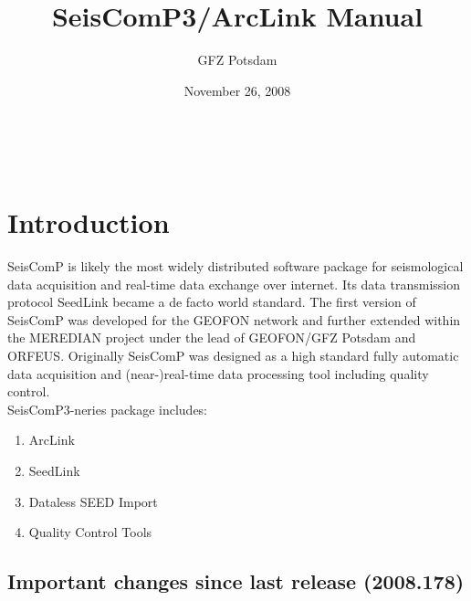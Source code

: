 \documentclass[11pt,a4paper,titlepage]{article}
\title{SeisComP3/ArcLink Manual}
\author{GFZ Potsdam}
\date{November 26, 2008}
\begin{document}
\maketitle

\setcounter{page}{2}


\
\vfill
\tableofcontents
\vfill
\

\clearpage


\section{Introduction}
SeisComP is likely the most widely distributed software package for seismological data acquisition and real-time data exchange over internet. Its data transmission protocol SeedLink became a de facto world standard. The ﬁrst version of SeisComP was developed for the GEOFON network and further extended within the MEREDIAN project under the lead of GEOFON/GFZ Potsdam and ORFEUS. Originally SeisComP was designed as a high standard fully automatic data acquisition and (near-)real-time data processing tool including quality control.\\

SeisComP3-neries package includes:
\begin{enumerate}
	\item ArcLink
	\item SeedLink
	\item Dataless SEED Import
	\item Quality Control Tools
\end{enumerate}

\subsection{Important changes since last release (2008.178)}
\end{document}
